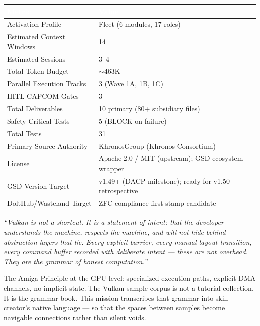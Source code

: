 \documentclass[11pt,letterpaper]{article}
\newcommand{\tableheader}[1]{\textbf{\sffamily\textcolor{white}{#1}}}
\begin{document}
\begin{center}
\begin{tabularx}{\textwidth}{L{5cm}X}
\toprule
{}
\tableheader{Metric} & \tableheader{Value} \\
\midrule
Activation Profile & Fleet (6 modules, 17 roles) \\
Estimated Context Windows & 14 \\
Estimated Sessions & 3--4 \\
Total Token Budget & $\sim$463K \\
Parallel Execution Tracks & 3 (Wave 1A, 1B, 1C) \\
HITL CAPCOM Gates & 3 \\
Total Deliverables & 10 primary (80+ subsidiary files) \\
Safety-Critical Tests & 5 (BLOCK on failure) \\
Total Tests & 31 \\
Primary Source Authority & KhronosGroup (Khronos Consortium) \\
License & Apache 2.0 / MIT (upstream); GSD ecosystem wrapper \\
GSD Version Target & v1.49+ (DACP milestone); ready for v1.50 retrospective \\
DoltHub/Wasteland Target & ZFC compliance first stamp candidate \\
\bottomrule
\end{tabularx}
\end{center}

\vspace{2em}

\begin{quotebox}
\textit{``Vulkan is not a shortcut. It is a statement of intent: that the developer understands the machine, respects the machine, and will not hide behind abstraction layers that lie. Every explicit barrier, every manual layout transition, every command buffer recorded with deliberate intent --- these are not overhead. They are the grammar of honest computation.''}

\vspace{0.8em}
\noindent The Amiga Principle at the GPU level: specialized execution paths, explicit DMA channels, no implicit state. The Vulkan sample corpus is not a tutorial collection. It is the grammar book. This mission transcribes that grammar into skill-creator's native language --- so that the spaces between samples become navigable connections rather than silent voids.
\end{quotebox}
\end{document}
